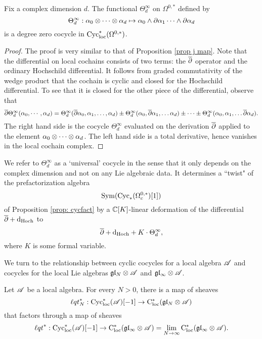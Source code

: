\begin{lem}
\label{lem: univ}
Fix a complex dimension $d$. 
The functional $\Theta^\infty_d$ on $\Omega^{0,*}$ defined by
\[
\Theta^\infty_d : \alpha_0 \otimes \cdots \otimes \alpha_d \mapsto \alpha_0 \wedge \partial \alpha_1 \cdots \wedge \partial \alpha_d
\]
is a degree zero cocycle in ${\rm Cyc}_{\rm loc}^*(\Omega^{0,*})$. 
\end{lem}
\begin{proof}
The proof is very similar to that of Proposition \ref{prop j map}. 
Note that the differential on local cochains consists of two terms: the $\overline{\partial}$ operator and the ordinary Hochschild differential. 
It follows from graded commutativity of the wedge product that the cochain is cyclic and closed for the Hochschild differential. 
To see that it is closed for the other piece of the differential, observe that
\[
\overline{\partial} \Theta^\infty_d(\alpha_0,\cdots,\alpha_d) = \Theta^\infty_d(\overline{\partial} \alpha_0, \alpha_1,\ldots,\alpha_d) \pm \Theta_d^\infty(\alpha_0, \overline{\partial} \alpha_1,\ldots \alpha_d) \pm \cdots \pm \Theta_d^\infty(\alpha_0, \alpha_1,\ldots \overline{\partial} \alpha_d) .
\]
The right hand side is the cocycle $\Theta_d^\infty$ evaluated on the derivation $\overline{\partial}$ applied to the element $\alpha_0 \otimes \cdots \otimes \alpha_d$. 
The left hand side is a total derivative, hence vanishes in the local cochain complex. 
\end{proof}

We refer to $\Theta^\infty_d$ as a `universal' cocycle in the sense that it only depends on the complex dimension and not on any Lie algebraic data. 
It determines a ``twist" of the prefactorization algebra 
\[
{\rm Sym}({\rm Cyc}_*(\Omega^{0,*}_c)[1])
\]
of Proposition \ref{prop: cycfact} by a $\mathbb C[K]$-linear deformation of the differential $\overline{\partial} + {\rm d}_{\rm Hoch}$ to
\[
\overline{\partial} + {\rm d}_{\rm Hoch} + K \cdot \Theta^\infty_d ,
\] 
where $K$ is some formal variable. 

We turn to the relationship between cyclic cocycles for a local algebra $\mathscr A$ and cocycles for the local Lie algebras $\mathfrak{g} \mathfrak{l}_N \otimes \mathscr A$ and $\mathfrak{g} \mathfrak{l}_\infty \otimes \mathscr A$.

\begin{prop}
\label{prop: cycloc}
Let $\mathscr A$ be a local algebra.
For every $N > 0$, there is a map of sheaves
\[
{\ell q t}_N^* : {\rm Cyc}_{\rm loc}^*(\mathscr A)[-1] \to {\rm C}_{\rm loc}^*(\mathfrak{g} \mathfrak{l}_N \otimes \mathscr A) 
\] 
that factors through a map of sheaves
\[
{\ell q t}^* : {\rm Cyc}_{\rm loc}^*(\mathscr A)[-1] \to {\rm C}_{\rm loc}^*(\mathfrak{g} \mathfrak{l}_\infty \otimes \mathscr A) = \lim_{N \to \infty} {\rm C}_{\rm loc}^*(\mathfrak{g} \mathfrak{l}_\infty \otimes \mathscr A)  .
\]
\end{prop}

